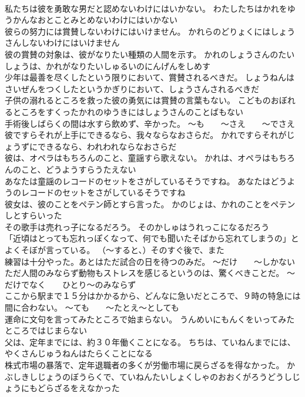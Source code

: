 \documentclass[8pt]{extreport}
\begin{document}
\begin{CJK}{UTF8}{min}
\\	私たちは彼を勇敢な男だと認めないわけにはいかない。	わたしたちはかれをゆうかんなおとことみとめないわけにはいかない 
\\	彼らの努力には賞賛しないわけにはいけません。	かれらのどりょくにはしょうさんしないわけにはいけません 
\\	彼の賞賛の対象は、彼がなりたい種類の人間を示す。	かれのしょうさんのたいしょうは、かれがなりたいしゅるいのにんげんをしめす 
\\	少年は最善を尽くしたという限りにおいて、賞賛されるべきだ。	しょうねんはさいぜんをつくしたというかぎりにおいて、しょうさんされるべきだ 
\\	子供の溺れるところを救った彼の勇気には賞賛の言葉もない。	こどものおぼれるところをすくったかれのゆうきにはしょうさんのことばもない 
\\	手術後しばらくの間は水すら飲めず、辛かった。	～も　　～さえ　　～でさえ
\\	彼ですらそれが上手にできるなら、我々ならなおさらだ。	かれですらそれがじょうずにできるなら、われわれならなおさらだ 
\\	彼は、オペラはもちろんのこと、童謡すら歌えない。	かれは、オペラはもちろんのこと、どうようすらうたえない 
\\	あなたは童謡のレコードのセットをさがしているそうですね。	あなたはどうようのレコードのセットをさがしているそうですね 
\\	彼女は、彼のことをペテン師とすら言った。	かのじょは、かれのことをペテンしとすらいった 
\\	その歌手は売れっ子になるだろう。	そのかしゅはうれっこになるだろう 
\\	「近頃はとっても忘れっぽくなって、何でも聞いたそばから忘れてしまうの」とよくそぼが言っている。	（～すると、）そのすぐ後で、また
\\	練習は十分やった。あとはただ試合の日を待つのみだ。	～だけ　　～しかない
\\	ただ人間のみならず動物もストレスを感じるというのは、驚くべきことだ。	～だけでなく　　ひとり～のみならず
\\	ここから駅まで１５分はかかるから、どんなに急いだところで、９時の特急には間に合わない。	～ても　　～たとえ～としても
\\	運命に文句を言ってみたところで始まらない。	うんめいにもんくをいってみたところではじまらない 
\\	父は、定年までには、約３０年働くことになる。	ちちは、ていねんまでには、やくさんじゅうねんはたらくことになる 
\\	株式市場の暴落で、定年退職者の多くが労働市場に戻らざるを得なかった。	かぶしきしじょうのぼうらくで、ていねんたいしょくしゃのおおくがろうどうしじょうにもどらざるをえなかった 

\end{CJK}
\end{document}
